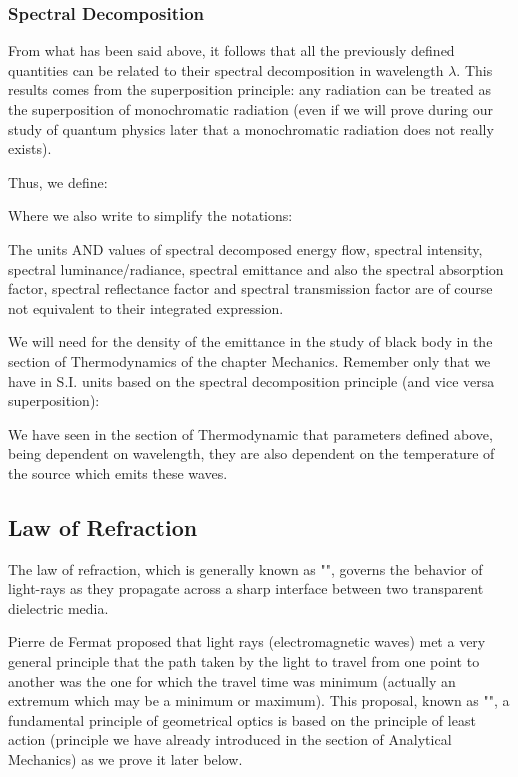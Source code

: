 	\subsubsection{Spectral Decomposition}
	From what has been said above, it follows that all the previously defined quantities can be related to their spectral decomposition in wavelength $\lambda$. This results comes from the superposition principle: any radiation can be treated as the superposition of monochromatic radiation (even if we will prove during our study of quantum physics later that a monochromatic radiation does not really exists).
	
	Thus, we define:
	
	Where we also write to simplify the notations:
	 
	\begin{tcolorbox}[title=Remark,colframe=black,arc=10pt]
	The units AND values of spectral decomposed energy flow, spectral intensity, spectral luminance/radiance, spectral emittance and also the spectral absorption factor, spectral reflectance factor and spectral transmission factor are of course not equivalent to their integrated expression.
	\end{tcolorbox}
	We will need for the density of the emittance in the study of black body in the section of Thermodynamics of the chapter Mechanics. Remember only that we have in S.I. units based on the spectral decomposition principle (and vice versa superposition):
	
	\begin{tcolorbox}[title=Remark,colframe=black,arc=10pt]
	 We have seen in the section of Thermodynamic that parameters defined above, being dependent on wavelength, they are also dependent on the temperature of the source which emits these waves.
	\end{tcolorbox}
	
	\subsection{Law of Refraction}
	The law of refraction, which is generally known as "", governs the behavior of light-rays as they propagate across a sharp interface between two transparent dielectric media.

	Pierre de Fermat proposed that light rays (electromagnetic waves) met a very general principle that the path taken by the light to travel from one point to another was the one for which the travel time was minimum (actually an extremum which may be a minimum or maximum). This proposal, known as "", a fundamental principle of geometrical optics is based on the principle of least action (principle we have already introduced in the section of Analytical Mechanics) as we prove it later below.


